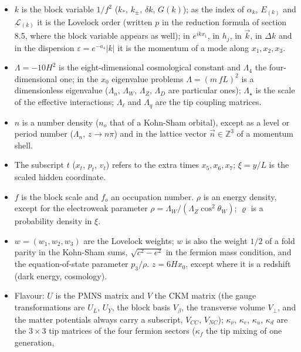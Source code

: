 \documentclass[
  10pt,
]{article}
\providecommand{\tightlist}{%
  \setlength{\itemsep}{0pt}\setlength{\parskip}{0pt}}
\begin{document}
\begin{itemize}
\tightlist
\item
  \(k\) is the block variable \(1/f^2\) (\(k_*\), \(k_\pm\),
  \(\delta k\), \(G(k)\)); as the index of \(\alpha_k\), \(E_{(k)}\) and
  \(\mathcal L_{(k)}\) it is the Lovelock order (written \(p\) in the
  reduction formula of section 8.5, where the block variable appears as
  well); in \(e^{ikx_1}\), in \(h_j\), in \(\vec k\), in \(\Delta k\)
  and in the dispersion \(\varepsilon = e^{-a_4}\lvert k\rvert\) it is
  the momentum of a mode along \(x_1, x_2, x_3\).
\item
  \(\Lambda = -10H^2\) is the eight-dimensional cosmological constant
  and \(\Lambda_4\) the four-dimensional one; in the \(x_0\) eigenvalue
  problems \(\Lambda = (m\,fL)^2\) is a dimensionless eigenvalue
  (\(\Lambda_n\), \(\Lambda_W\), \(\Lambda_Z\), \(\Lambda_D\) are
  particular ones); \(\Lambda_\star\) is the scale of the effective
  interactions; \(\Lambda_\ell\) and \(\Lambda_q\) are the tip coupling
  matrices.
\item
  \(n\) is a number density (\(n_o\) that of a Kohn-Sham orbital),
  except as a level or period number (\(\Lambda_n\), \(z \to n\pi\)) and
  in the lattice vector \(\vec n \in \mathbb Z^3\) of a momentum shell.
\item
  The subscript \(t\) (\(x_t\), \(p_t\), \(v_t\)) refers to the extra
  times \(x_5, x_6, x_7\); \(\xi = y/L\) is the scaled hidden
  coordinate.
\item
  \(f\) is the block scale and \(f_o\) an occupation number. \(\rho\) is
  an energy density, except for the electroweak parameter
  \(\rho = \Lambda_W/(\Lambda_Z\cos^2\theta_W)\); \(\varrho\) is a
  probability density in \(\xi\).
\item
  \(w = (w_1, w_2, w_3)\) are the Lovelock weights; \(w\) is also the
  weight \(1/2\) of a fold parity in the Kohn-Sham sums,
  \(\sqrt{c^2 - e^2}\) in the fermion mass condition, and the
  equation-of-state parameter \(p_3/\rho\). \(z = 6Hx_0\), except where
  it is a redshift (dark energy, cosmology).
\item
  Flavour: \(U\) is the PMNS matrix and \(V\) the CKM matrix (the gauge
  transformations are \(U_L\), \(U_Y\), the block basis \(V_\beta\), the
  transverse volume \(V_\perp\), and the matter potentials always carry
  a subscript, \(V_{CC}\), \(V_{NC}\)); \(\kappa_\nu\), \(\kappa_e\),
  \(\kappa_u\), \(\kappa_d\) are the \(3\times3\) tip matrices of the
  four fermion sectors (\(\kappa_f\) the tip mixing of one generation,

\end{itemize}
\end{document}
